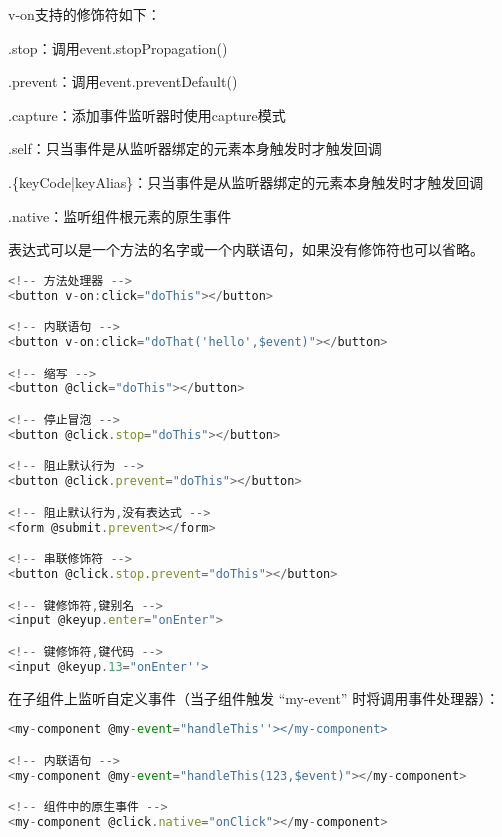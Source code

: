 v-on支持的修饰符如下：


\begin{compactitem}
\item .stop：调用event.stopPropagation()
\item .prevent：调用event.preventDefault()
\item .capture：添加事件监听器时使用capture模式
\item .self：只当事件是从监听器绑定的元素本身触发时才触发回调
\item .\{keyCode|keyAlias\}：只当事件是从监听器绑定的元素本身触发时才触发回调
\item .native：监听组件根元素的原生事件
\end{compactitem}

表达式可以是一个方法的名字或一个内联语句，如果没有修饰符也可以省略。



\begin{lstlisting}[language=JavaScript]
<!-- 方法处理器 -->
<button v-on:click="doThis"></button>

<!-- 内联语句 -->
<button v-on:click="doThat('hello',$event)"></button>

<!-- 缩写 -->
<button @click="doThis"></button>

<!-- 停止冒泡 -->
<button @click.stop="doThis"></button>

<!-- 阻止默认行为 -->
<button @click.prevent="doThis"></button>

<!-- 阻止默认行为,没有表达式 -->
<form @submit.prevent></form>

<!-- 串联修饰符 -->
<button @click.stop.prevent="doThis"></button>

<!-- 键修饰符,键别名 -->
<input @keyup.enter="onEnter">

<!-- 键修饰符,键代码 -->
<input @keyup.13="onEnter''>
\end{lstlisting}

在子组件上监听自定义事件（当子组件触发 “my-event” 时将调用事件处理器）：

\begin{lstlisting}[language=JavaScript]
<my-component @my-event="handleThis''></my-component>

<!-- 内联语句 -->
<my-component @my-event="handleThis(123,$event)"></my-component>

<!-- 组件中的原生事件 -->
<my-component @click.native="onClick"></my-component>
\end{lstlisting}




